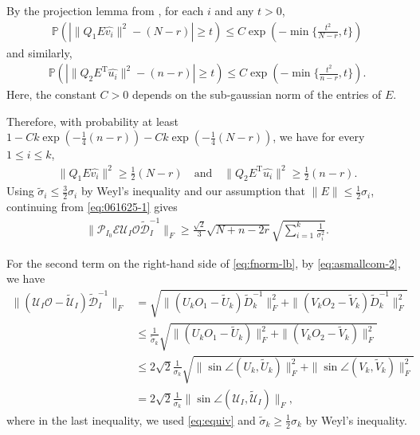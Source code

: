 \documentclass[reqno]{amsart}
\newcommand{\Prob}{\mathbb{P}}
\newcommand{\T}{\mathrm{T}}
\theoremstyle{plain}
\theoremstyle{definition}
\begin{document}
By the projection lemma from \cite[Lemma 11.8]{OVW}, for each $i$ and any $t>0$,
\begin{align*}
\Prob\left(|\|Q_1 E \hat{v_i}\|^2 - (N-r)| \ge t \right) \le C\exp\left(-\min\Big\{\frac{t^2}{N-r}, t \Big\}\right)
\end{align*}
and similarly, 
\begin{align*}
\Prob\left(|\|Q_2 E^\T \hat{u_i}\|^2 - (n-r)| \ge t \right) \le C\exp\left(-\min\Big\{\frac{t^2}{n-r}, t \Big\}\right).
\end{align*}
Here, the constant $C>0$ depends on the sub-gaussian norm of the entries of $E$. 

Therefore,  with probability at least $1-Ck\exp(-\frac{1}{4}(n-r))-Ck\exp(-\frac{1}{4}(N-r))$, we have for every $1\le i \le k$,
\begin{align*}
\|Q_1 E \hat{v_i}\|^2 \ge \frac{1}{2}(N-r) \quad\text{and}\quad \|Q_2 E^\T \hat{u_i}\|^2 \ge \frac{1}{2}(n-r).
\end{align*}
Using $\widetilde{\sigma}_i \le \frac{3}{2}\sigma_i$ by Weyl's inequality and our assumption that $\|E\| \le \frac{1}{2}\sigma_i$,  continuing from \eqref{eq:061625-1} gives
\begin{align*}
\|\mathcal P_{I_0} \mathcal E {\mathcal U}_{I}\mathcal O \widetilde{\mathcal D}_I^{-1}\|_F  \ge \frac{\sqrt{2}}{3} \sqrt{N+n-2r} \sqrt{\sum_{i=1}^k \frac{1}{\sigma_i^2}}.
\end{align*}

For the second term on the right-hand side of \eqref{eq:fnorm-lb}, by \eqref{eq:asmallcom-2}, we have
\begin{align*}
\|({\mathcal U}_{I}\mathcal O- \widetilde{\mathcal U}_{I}) \widetilde{\mathcal D}_I^{-1} \|_F &= \sqrt{\|(U_k O_1 - \widetilde{U}_k)\widetilde{D}_k^{-1} \|_F^2 + \|(V_k O_2 - \widetilde{V}_k)\widetilde{D}_k^{-1}\|_F^2 }\\
&\le \frac{1}{\widetilde{\sigma}_k} \sqrt{\|(U_k O_1 - \widetilde{U}_k) \|_F^2 + \|(V_k O_2 - \widetilde{V}_k)\|_F^2 }\\
&\le 2\sqrt{2} \frac{1}{\sigma_k}\sqrt{\|\sin\angle(U_k, \widetilde{U}_k) \|_F^2 + \|\sin\angle(V_k, \widetilde{V}_k)\|_F^2 } \\
&= 2\sqrt{2} \frac{1}{\sigma_k}\| \sin \angle (\mathcal U_{I}, \widetilde{\mathcal U}_{I}) \|_F,
\end{align*}
where in the last inequality, we used \eqref{eq:equiv} and $\widetilde{\sigma}_k \ge \frac{1}{2}\sigma_k$ by Weyl's inequality.
\end{document}
